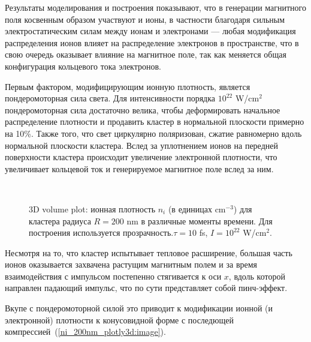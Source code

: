 Результаты моделирования и построения показывают, что в генерации магнитного поля косвенным образом участвуют и ионы, в частности благодаря сильным электростатическим силам между ионам и электронами --- любая модификация распределения ионов влияет на распределение электронов в пространстве, что в свою очередь оказывает влияние на магнитное поле, так как меняется общая конфигурация кольцевого тока электронов.


Первым фактором, модифицирующим ионную плотность, является пондеромоторная сила света. Для интенсивности порядка $10^{22}$ W/cm$^2$ пондеромоторная сила достаточно велика, чтобы деформировать начальное распределение плотности и продавить кластер в нормальной плоскости примерно на 10\%. Также того, что свет циркулярно поляризован, сжатие равномерно вдоль нормальной плоскости кластера. Вслед за уплотнением ионов на передней поверхности кластера происходит увеличение электронной плотности, что увеличивает кольцевой ток и генерируемое магнитное поле вслед за ним.

\begin{figure}[H]
    \hfil
    \\
    \hfil
    \caption{3D volume plot: ионная плотность $n_i$ (в единицах cm$^{-3}$) для кластера радиуса $R = 200$ nm в различные моменты времени. Для построения используется прозрачность.$\tau = 10$ fs, $I = 10^{22}$ W/cm$^2$.}\label{ni_200nm_plotly3d:image}
\end{figure}

Несмотря на то, что кластер испытывает тепловое расширение, большая часть ионов оказывается захвачена растущим магнитным полем и за время взаимодействия с импульсом постепенно стягивается к оси $x$, вдоль которой направлен падающий импульс, что по сути представляет собой пинч-эффект. 

Вкупе с пондеромоторной силой это приводит к модификации ионной (и электронной) плотности к конусовидной форме с последющей компрессией~(\autoref{ni_200nm_plotly3d:image}). 

